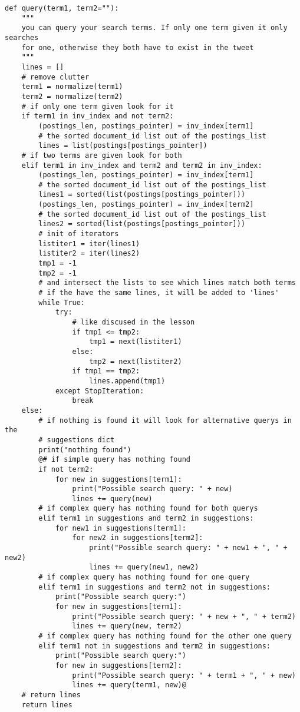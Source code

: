 \documentclass[12pt,pdftex,a4paper]{article}
\begin{document}
\begin{lstlisting}[style=base]
def query(term1, term2=""):
    """
    you can query your search terms. If only one term given it only searches
    for one, otherwise they both have to exist in the tweet
    """
    lines = []
    # remove clutter
    term1 = normalize(term1)
    term2 = normalize(term2)
    # if only one term given look for it
    if term1 in inv_index and not term2:
        (postings_len, postings_pointer) = inv_index[term1]
        # the sorted document_id list out of the postings_list
        lines = list(postings[postings_pointer])
    # if two terms are given look for both
    elif term1 in inv_index and term2 and term2 in inv_index:
        (postings_len, postings_pointer) = inv_index[term1]
        # the sorted document_id list out of the postings_list
        lines1 = sorted(list(postings[postings_pointer]))
        (postings_len, postings_pointer) = inv_index[term2]
        # the sorted document_id list out of the postings_list
        lines2 = sorted(list(postings[postings_pointer]))
        # init of iterators
        listiter1 = iter(lines1)
        listiter2 = iter(lines2)
        tmp1 = -1
        tmp2 = -1
        # and intersect the lists to see which lines match both terms
        # if the have the same lines, it will be added to 'lines'
        while True:
            try:
                # like discused in the lesson
                if tmp1 <= tmp2:
                    tmp1 = next(listiter1)
                else:
                    tmp2 = next(listiter2)
                if tmp1 == tmp2:
                    lines.append(tmp1)
            except StopIteration:
                break
    else:
        # if nothing is found it will look for alternative querys in the
        # suggestions dict
        print("nothing found")
        @# if simple query has nothing found
        if not term2:
            for new in suggestions[term1]:
                print("Possible search query: " + new)
                lines += query(new)
        # if complex query has nothing found for both querys
        elif term1 in suggestions and term2 in suggestions:
            for new1 in suggestions[term1]:
                for new2 in suggestions[term2]:
                    print("Possible search query: " + new1 + ", " + new2)
                    lines += query(new1, new2)
        # if complex query has nothing found for one query
        elif term1 in suggestions and term2 not in suggestions:
            print("Possible search query:")
            for new in suggestions[term1]:
                print("Possible search query: " + new + ", " + term2)
                lines += query(new, term2)
        # if complex query has nothing found for the other one query
        elif term1 not in suggestions and term2 in suggestions:
            print("Possible search query:")
            for new in suggestions[term2]:
                print("Possible search query: " + term1 + ", " + new)
                lines += query(term1, new)@
    # return lines
    return lines



\end{lstlisting}
\end{document}

